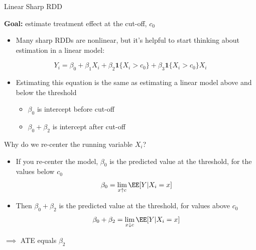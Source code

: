 \begin{frame}{Linear Sharp RDD}

\textbf{Goal: } estimate treatment effect at the cut-off, $c_0$


\begin{itemize}
    \item Many sharp RDDs are nonlinear, but it's helpful to start thinking about estimation in a linear model:
\end{itemize}
\begin{equation*}
    Y_i = \beta_0 + \beta_1 X_i + \beta_2 \mathbf{1}\{X_i > c_0\} +  \beta_3  \mathbf{1}\{X_i > c_0\} X_i
\end{equation*}
\begin{itemize}
    \item Estimating this equation is the same as estimating a linear model above and below the threshold
    \begin{itemize}
        \item $\beta_0$ is intercept before cut-off
        \item $\beta_0 + \beta_2$ is intercept after cut-off
    \end{itemize}
\end{itemize}
Why do we re-center the running variable $X_i$?
\begin{itemize}
    \item If you re-center the model, $\beta_0$ is the predicted value at the threshold, for the values below $c_0$
    \begin{equation*}
        \beta_0 = \lim_{x \uparrow c} \EE [Y \vert X_i = x]
    \end{equation*}
    \item Then $\beta_0 + \beta_2$ is the predicted value at the threshold, for values above $c_0$
    \begin{equation*}
        \beta_0 + \beta_2 = \lim_{x \downarrow c} \EE [Y \vert X_i = x]
    \end{equation*}
\end{itemize}
$\implies$ ATE equals $\beta_2$

\end{frame}




